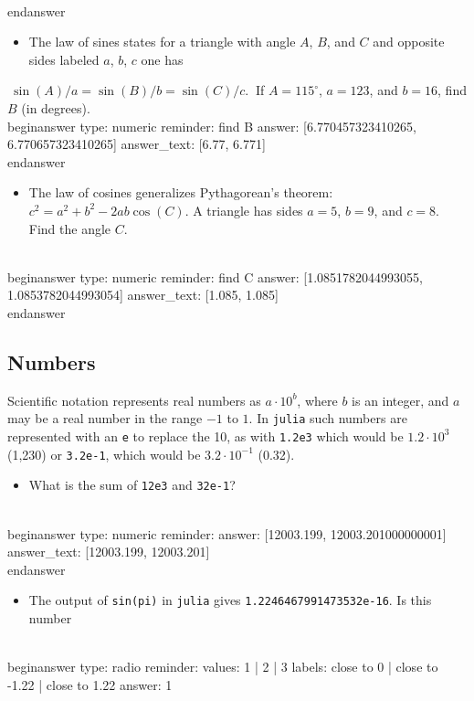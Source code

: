 \documentclass[12pt]{article}
\begin{document}
\\end{answer}
\begin{itemize}\item The law of sines states for a triangle with angle $A$, $B$, and $C$ and opposite sides labeled $a$, $b$, $c$ one has \end{itemize}$~ 
\sin(A)/a = \sin(B)/b = \sin(C)/c.
~$\newline
If $A=115^\circ$, $a=123$, and $b=16$, find $B$ (in degrees).
\\begin{answer}
    type: numeric
    reminder: find B
    answer: [6.770457323410265, 6.770657323410265]
    answer_text: [6.77, 6.771] 
\\end{answer}
\begin{itemize}\item The law of cosines generalizes Pythagorean's theorem: $c^2 = a^2 +   b^2 - 2ab \cos(C)$. A triangle has sides $a=5$, $b=9$, and   $c=8$. Find the angle $C$.\end{itemize}
\\begin{answer}
    type: numeric
    reminder: find C
    answer: [1.0851782044993055, 1.0853782044993054]
    answer_text: [1.085, 1.085] 
\\end{answer}
\subsection{Numbers}\newline
Scientific notation represents real numbers as $a \cdot 10^b$, where $b$ is an integer, and $a$ may be a real number in the range $-1$ to $1$. In \texttt{julia} such numbers are represented with an \texttt{e} to replace the 10, as with \texttt{1.2e3} which would be $1.2 \cdot 10^3$ (1,230) or \texttt{3.2e-1}, which would be $3.2 \cdot 10^{-1}$ (0.32).\begin{itemize}\item What is the sum of \texttt{12e3} and \texttt{32e-1}?\end{itemize}
\\begin{answer}
    type: numeric
    reminder: 
    answer: [12003.199, 12003.201000000001]
    answer_text: [12003.199, 12003.201] 
\\end{answer}
\begin{itemize}\item The output of \texttt{sin(pi)} in \texttt{julia} gives \texttt{1.2246467991473532e-16}. Is this number\end{itemize}
\\begin{answer}
type: radio
reminder: 
values: 1 | 2 | 3
labels: close to 0 | close to -1.22 | close to 1.22
answer: 1
\end{document}
